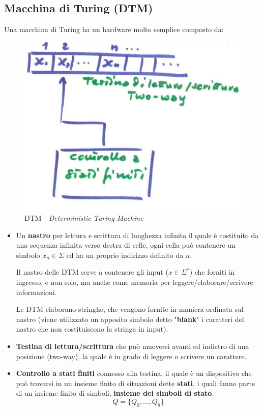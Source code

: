 \documentclass{article}
\begin{document}
\subsection{Macchina di Turing (DTM)}
Una macchina di Turing ha un hardware molto semplice composto da:
\begin{figure}[H]
    \centering
    \includegraphics[scale=0.5]{images/DTM.png}
    \caption{DTM - \textit{Deterministic Turing Machine}}
\end{figure}

\begin{itemize}
    \item Un \textbf{nastro} per lettura e scrittura di lunghezza infinita il quale è costituito
          da una sequenza infinita verso destra di celle, ogni cella può contenere un simbolo $x_n\in\Sigma$ ed
          ha un proprio indirizzo definito da $n$.

          Il nastro delle DTM serve a contenere gli input ($x\in\Sigma^*$)
          che forniti in ingresso, e non solo, ma anche come memoria per leggere/elaborare/scrivere
          informazioni.

          Le DTM elaborano stringhe, che vengono fornite in maniera ordinata
          sul nastro (viene utilizzato un apposito simbolo detto "\textbf{blank}"
          i caratteri del nastro che non costituiscono la stringa in input).

    \item \textbf{Testina di lettura/scrittura} che può muoversi avanti ed indietro di una posizione (two-way),
          la quale è in grado di leggere o scrivere un carattere.

    \item \textbf{Controllo a stati finiti} connesso alla testina, il quale è un dispositivo che può trovarsi
          in un insieme finito di situazioni dette \textbf{stati}, i quali fanno parte di un insieme finito di
          simboli, \textbf{insieme dei simboli di stato}.
          $$Q=\{Q_0,\dots,Q_8\}$$
\end{itemize}
\end{document}
